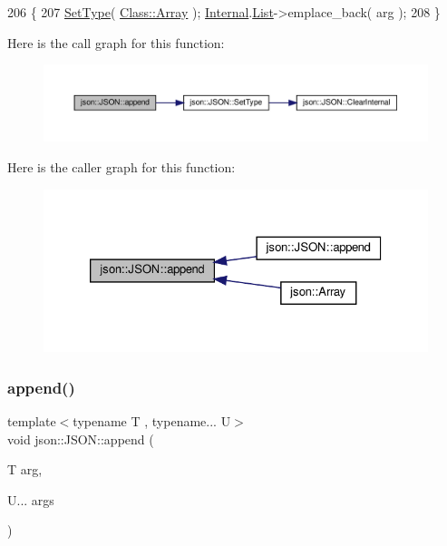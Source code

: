 \begin{DoxyCode}
206                              \{
207             \mbox{\hyperlink{classjson_1_1_j_s_o_n_a668500208950e48394fc8bfe7c320205}{SetType}}( \mbox{\hyperlink{classjson_1_1_j_s_o_n_a762f55df6d407c1af61607ed516ffe07a4410ec34d9e6c1a68100ca0ce033fb17}{Class::Array}} ); \mbox{\hyperlink{classjson_1_1_j_s_o_n_a1e2a064794c3d55c8bb8887fc5734947}{Internal}}.\mbox{\hyperlink{unionjson_1_1_j_s_o_n_1_1_backing_data_ab85f5e7ad21f9f7a5407ab73128a3ebc}{List}}->emplace\_back( arg );
208         \}
\end{DoxyCode}
Here is the call graph for this function\+:
\nopagebreak
\begin{figure}[H]
\begin{center}
\leavevmode
\includegraphics[width=350pt]{classjson_1_1_j_s_o_n_aafb54a2b47ec9bbd7548a60db23fb4cf_cgraph}
\end{center}
\end{figure}
Here is the caller graph for this function\+:
\nopagebreak
\begin{figure}[H]
\begin{center}
\leavevmode
\includegraphics[width=326pt]{classjson_1_1_j_s_o_n_aafb54a2b47ec9bbd7548a60db23fb4cf_icgraph}
\end{center}
\end{figure}
\mbox{\label{classjson_1_1_j_s_o_n_ac6a839771cd2c373614e9640eeef6e13}} 
\subsubsection{\texorpdfstring{append()}{append()}\hspace{0.1cm}{\footnotesize\ttfamily [2/2]}}
{\footnotesize\ttfamily template$<$typename T , typename... U$>$ \\
void json\+::\+J\+S\+O\+N\+::append (\begin{DoxyParamCaption}\item[{T}]{arg,  }\item[{U...}]{args }\end{DoxyParamCaption})\hspace{0.3cm}{\ttfamily [inline]}}



